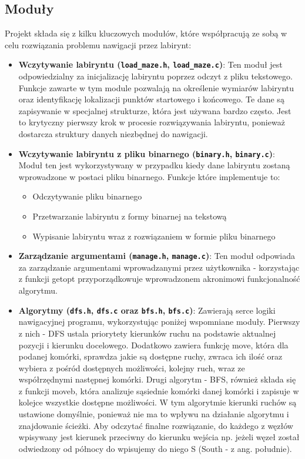 \documentclass{article}
\begin{document}
\subsection{Moduły}

Projekt składa się z kilku kluczowych modułów, które współpracują ze sobą w celu rozwiązania problemu nawigacji przez labirynt:

\begin{itemize}   
    \item \textbf{Wczytywanie labiryntu (\texttt{load\_maze.h}, \texttt{load\_maze.c})}: Ten moduł jest odpowiedzialny za inicjalizację labiryntu poprzez odczyt z pliku tekstowego.
    Funkcje zawarte w tym module pozwalają na określenie wymiarów labiryntu oraz identyfikację lokalizacji punktów startowego i końcowego. Te dane są zapisywanie w specjalnej strukturze, która jest używana bardzo często. Jest to krytyczny pierwszy krok w procesie rozwiązywania labiryntu, ponieważ dostarcza struktury danych niezbędnej do nawigacji.

    \item \textbf{Wczytywanie labiryntu z pliku binarnego (\texttt{binary.h}, \texttt{binary.c})}: Moduł ten jest wykorzystywany w przypadku kiedy dane labiryntu zostaną wprowadzone w postaci pliku binarnego. Funkcje które implementuje to:
        
        \begin{itemize}
          \item Odczytywanie pliku binarnego
          \item Przetwarzanie labiryntu z formy binarnej na tekstową
          \item Wypisanie labiryntu wraz z rozwiązaniem w formie pliku binarnego
        \end{itemize}

    \item \textbf{Zarządzanie argumentami (\texttt{manage.h}, \texttt{manage.c})}: Ten moduł odpowiada za zarządzanie argumentami wprowadzanymi przez użytkownika - korzystając z funkcji getopt przyporządkowuje wprowadzonem akronimowi funkcjonalność algorytmu.

    \item \textbf{Algorytmy (\texttt{dfs.h}, \texttt{dfs.c} oraz \texttt{bfs.h}, \texttt{bfs.c})}:
    Zawierają serce logiki nawigacyjnej programu, wykorzystując poniżej wspomniane moduły. Pierwszy z nich - DFS ustala priorytety kierunków ruchu na podstawie aktualnej pozycji i kierunku docelowego. Dodatkowo zawiera funkcję move, która dla podanej komórki,  sprawdza jakie są dostępne ruchy, zwraca ich ilość oraz wybiera z pośród dostępnych możliwości, kolejny ruch, wraz ze współrzędnymi następnej komórki. Drugi algorytm - BFS, również składa się z funkcji moveb, która analizuje sąsiednie komórki danej komórki i zapisuje w kolejce wszystkie dostępne możliwości. W tym algorytmie kierunki ruchów są ustawione domyślnie, ponieważ nie ma to wpływu na działanie algorytmu i znajdowanie ścieżki. Aby odczytać finalne rozwiązanie, do każdego z węzłów wpisywany jest kierunek przeciwny do kierunku wejścia np. jeżeli węzeł został odwiedzony od północy do wpisujemy do niego S (South - z ang. południe).


\end{itemize}
\end{document}
